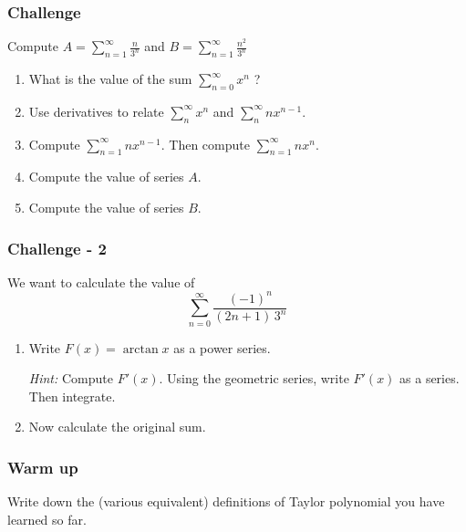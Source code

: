 \documentclass[14pt]{beamer}
\begin{document}
\begin{frame}[t]
	\frametitle{Challenge}

	Compute \quad $\displaystyle A = \sum_{n=1}^{\infty}\frac{n}{3^{n}}$ \quad and
	\quad $\displaystyle B = \sum_{n=1}^{\infty}\frac{n^{2}}{3^{n}}$

	\hrulefill

	\begin{enumerate}
		\item What is the value of the sum $\displaystyle \sum_{n=0}^{\infty}x^{n}$ ?

		\item Use derivatives to relate $\displaystyle \sum_{n}^{\infty}x^{n}$ and $\displaystyle
			\sum_{n}^{\infty}nx^{n-1}$.

		\item Compute $\displaystyle \sum_{n=1}^{\infty}n x^{n-1}$. \quad Then
			compute $\displaystyle \sum_{n=1}^{\infty}n x^{n}$.

		\item Compute the value of series $A$.

		\item Compute the value of series $B$.
	\end{enumerate}
\end{frame}

\begin{frame}[t]
	\frametitle{Challenge - 2}

	We want to calculate the value of
	\[
		\sum_{n=0}^{\infty}\frac{(-1)^{n}}{(2n+1) \, 3^{n}}
	\]

	\hrulefill

	\begin{enumerate}
		\item Write $\displaystyle F(x) = \arctan x$ as a power series.
			\vspace{.5cm}

			\emph{Hint:} Compute $\displaystyle F'(x)$. Using the geometric series,
			write $\displaystyle F'(x)$ as a series. Then integrate.
			\vspace{.5cm}

		\item Now calculate the original sum.
	\end{enumerate}
\end{frame}

\begin{frame}[t]
	\frametitle{Warm up}

	Write down the (various equivalent) definitions of Taylor polynomial you have
	learned so far.
\end{frame}
\end{document}
